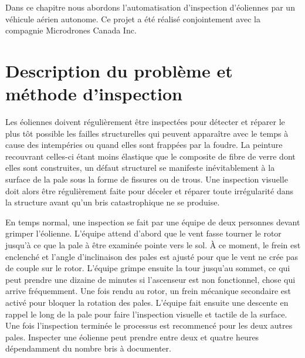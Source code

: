 \label{sec:uav}

Dans ce chapitre nous abordons l'automatisation d'inspection d'éoliennes par un véhicule aérien autonome. Ce projet a été réalisé conjointement avec la compagnie Microdrones Canada Inc.

\section{Description du problème et méthode d'inspection}

Les éoliennes doivent régulièrement être inspectées pour détecter et réparer le plus tôt possible les failles structurelles qui peuvent apparaître avec le temps à cause des intempéries ou quand elles sont frappées par la foudre. La peinture recouvrant celles-ci étant moins élastique que le composite de fibre de verre dont elles sont construites, un défaut structurel se manifeste inévitablement à la surface de la pale sous la forme de fissures ou de trous. Une inspection visuelle doit alors être régulièrement faite pour déceler et réparer toute irrégularité dans la structure avant qu'un bris catastrophique ne se produise.

En temps normal, une inspection se fait par une équipe de deux personnes devant grimper l'éolienne. L'équipe attend d'abord que le vent fasse tourner le rotor jusqu'à ce que la pale à être examinée pointe vers le sol. À ce moment, le frein est enclenché et l'angle d'inclinaison des pales est ajusté pour que le vent ne crée pas de couple sur le rotor. L'équipe grimpe ensuite la tour jusqu'au sommet, ce qui peut prendre une dizaine de minutes si l'ascenseur est non fonctionnel, chose qui arrive fréquemment. Une fois rendu au rotor, un frein mécanique secondaire est activé pour bloquer la rotation des pales. L'équipe fait ensuite une descente en rappel le long de la pale pour faire l'inspection visuelle et tactile de la surface. Une fois l'inspection terminée le processus est recommencé pour les deux autres pales. Inspecter une éolienne peut prendre entre deux et quatre heures dépendamment du nombre bris à documenter.


